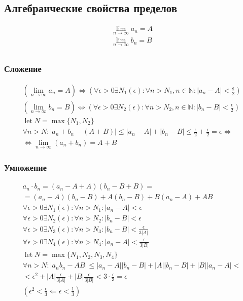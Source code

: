 \documentclass{article}
\DeclareMathOperator*{\Let}{let}
\begin{document}
\subsection{Алгебраические свойства пределов}

\begin{gather*}
	\lim_{n \to \infty} a_n = A \\
	\lim_{n \to \infty} b_n = B \\
\end{gather*}

\subsubsection{Сложение}

\begin{gather*}
	(\lim_{n \to \infty} a_n = A) \Leftrightarrow (\forall \epsilon > 0 \exists N_1(\epsilon) :
	\forall n > N_1, n \in \mathbb{N} : |a_n - A| < \frac{\epsilon}{2}) \\
	(\lim_{n \to \infty} b_n = B) \Leftrightarrow (\forall \epsilon > 0 \exists N_2(\epsilon) :
	\forall n > N_2, n \in \mathbb{N} : |b_n - B| < \frac{\epsilon}{2}) \\
	\Let N = \max\{N_1, N_2\} \\
	\forall n > N : |a_n + b_n - (A + B)| \le |a_n - A| + |b_n - B| \le
	\frac{\epsilon}{2} + \frac{\epsilon}{2} = \epsilon \Leftrightarrow \\
	\Leftrightarrow \lim_{n \to \infty} (a_n + b_n) = A + B
\end{gather*}

\subsubsection{Умножение}

\begin{gather*}
	a_n \cdot b_n = (a_n - A + A)(b_n - B + B) = \\
	= (a_n - A)(b_n - B) + A(b_n - B) + B(a_n - A) + AB \\
	\forall \epsilon > 0 \exists N_1(\epsilon) : \forall n > N_1 : |a_n - A| < \epsilon \\
	\forall \epsilon > 0 \exists N_2(\epsilon) : \forall n > N_2 : |b_n - B| < \epsilon \\
	\forall \epsilon > 0 \exists N_3(\epsilon) : \forall n > N_3 : |b_n - B| < \frac{\epsilon}{3|A|} \\
	\forall \epsilon > 0 \exists N_4(\epsilon) : \forall n > N_4 : |a_n - A| < \frac{\epsilon}{3|B|} \\
	\Let N = \max\{N_1, N_2, N_3, N_4\} \\
	\forall n > N : |a_n b_n - AB| \le |a_n - A||b_n - B| + |A||b_n - B| + |B||a_n - A| < \\
	< \epsilon^2 + |A| \frac{\epsilon}{3|A|} + |B| \frac{\epsilon}{3|B|} < 3 \cdot \frac{\epsilon}{3} = \epsilon \\
	(\epsilon^2 < \frac{\epsilon}{3} \Leftarrow \epsilon < \frac{1}{3})
\end{gather*}
\end{document}
